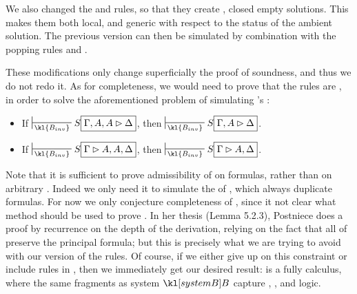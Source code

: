 \begin{remark}
  We also changed the \rsf{\bot{-}} and \rsf{\top{+}} rules, so that they create
  , closed empty solutions. This makes them both local, and generic
  with respect to the status of the ambient solution. The previous version can
  then be simulated by combination with the popping rules  and
  .
\end{remark}

These modifications only change superficially the proof of soundness, and thus
we do not redo it. As for completeness, we would need to prove that the
 rules are , in order to solve the aforementioned problem
of simulating 's :

\begin{lemma}
  \sbr
  \begin{itemize}
    \item If $\prov{\kl{B_{inv}}} S\select{\Gamma, A, A \J \Delta}$, then
          $\prov{\kl{B_{inv}}} S\select{\Gamma, A \J \Delta}$.
    \item If $\prov{\kl{B_{inv}}} S\select{\Gamma \J A, A, \Delta}$, then
          $\prov{\kl{B_{inv}}} S\select{\Gamma \J A, \Delta}$.
  \end{itemize}
\end{lemma}

Note that it is sufficient to prove admissibility of  on
formulas, rather than on arbitrary . Indeed we only need it to simulate the
 of , which always duplicate formulas. For now
we only conjecture completeness of , since it not clear what method
should be used to prove . In her thesis
\cite{postniece_proof_2010} (Lemma 5.2.3), Postniece does a proof by recurrence
on the depth of the derivation, relying on the fact that all  of  preserve the principal formula; but this is precisely what
we are trying to avoid with our version of the rules. Of course, if we either
give up on this constraint or include  rules in , then we
immediately get our desired result:  is a fully  calculus,
where the same fragments as system $\sysB$ capture ,
,  and  logic.

